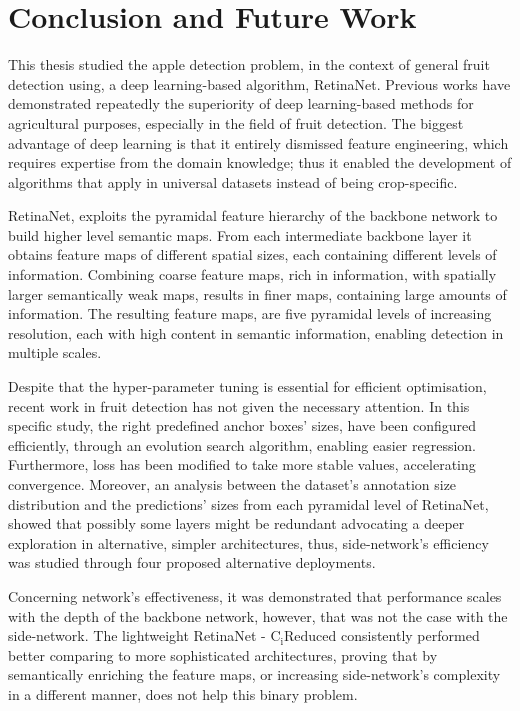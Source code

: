 \chapter{Conclusion and Future Work} \label{Chapter: Conclusion}
This thesis studied the apple detection problem, in the context of general fruit detection using, a deep learning-based algorithm, RetinaNet. Previous works have demonstrated repeatedly the superiority of deep learning-based methods for agricultural purposes, especially in the field of fruit detection. The biggest advantage of deep learning is that it entirely dismissed feature engineering, which requires expertise from the domain knowledge; thus it enabled the development of algorithms that apply in universal datasets instead of being crop-specific.

RetinaNet, exploits the pyramidal feature hierarchy of the backbone network to build higher level semantic maps. From each intermediate backbone layer it obtains feature maps of different spatial sizes, each containing different levels of information. Combining coarse feature maps, rich in information, with spatially larger semantically weak maps, results in finer maps, containing large amounts of information. The resulting feature maps, are five pyramidal levels of increasing resolution, each with high content in semantic information, enabling detection in multiple scales.

Despite that the hyper-parameter tuning is essential for efficient optimisation, recent work in fruit detection has not given the necessary attention. In this specific study, the right predefined anchor boxes' sizes, have been configured efficiently, through an evolution search algorithm, enabling easier regression. Furthermore, loss has been modified to take more stable values, accelerating convergence. Moreover, an analysis between the dataset's annotation size distribution and the predictions' sizes from each pyramidal level of RetinaNet, showed that possibly some layers might be redundant advocating a deeper exploration in alternative, simpler architectures, thus, side-network's efficiency was studied through four proposed alternative deployments.

Concerning network's effectiveness, it was demonstrated that performance scales with the depth of the backbone network, however, that was not the case with the side-network. The lightweight RetinaNet - $\text{C}_\text{i}\text{Reduced}$ consistently performed better comparing to more sophisticated architectures, proving that by semantically enriching the feature maps, or increasing side-network's complexity in a different manner, does not help this binary problem.

